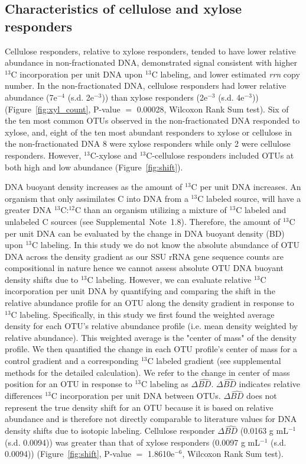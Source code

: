 \subsection{Characteristics of cellulose and xylose responders}
Cellulose responders, relative to xylose responders, tended to have lower
relative abundance in non-fractionated DNA, demonstrated signal consistent
with higher $^{13}$C incorporation per unit DNA upon $^{13}$C labeling, and
lower estimated \textit{rrn} copy number. In the
non-fractionated DNA, cellulose responders had lower
relative abundance (7e$^{-4}$ (s.d. 2e$^{-3}$)) than xylose responders
(2e$^{-3}$ (s.d. 4e$^{-3}$)) (Figure~\ref{fig:xyl_count}, P-value $=$ 0.00028,
Wilcoxon Rank Sum test). Six of the ten most common OTUs observed in the
non-fractionated DNA responded to xylose, and, eight of the ten most
abundant responders to xylose or cellulose in the non-fractionated DNA
8 were xylose responders while only 2 were cellulose responders. However,
$^{13}$C-xylose and $^{13}$C-cellulose responders included OTUs at both high
and low abundance (Figure~\ref{fig:shift}).

DNA buoyant density increases as the amount of $^{13}$C per unit DNA increases.
An organism that only assimilates C into DNA from a $^{13}$C labeled source,
will have a greater DNA $^{13}$C:$^{12}$C than an
organism utilizing a mixture of $^{13}$C labeled and unlabeled C sources (see
Supplemental~Note~1.8). Therefore, the amount of $^{13}$C per unit DNA
can be evaluated by the change in DNA buoyant density (BD)
upon $^{13}$C labeling. In this study we do not know the absolute abundance of
OTU DNA across the density gradient as our SSU rRNA gene sequence counts are
compositional in nature hence we cannot assess absolute OTU DNA buoyant density
shifts due to $^{13}$C labeling. However, we can evaluate relative $^{13}$C
incorporation per unit DNA by quantifying and comparing the
shift in the relative abundance profile for an OTU along the density gradient
in response to $^{13}$C labeling. Specifically, in this study we first found
the weighted average density for each OTU's relative abundance profile (i.e.
mean density weighted by relative abundance). This weighted average is the
"center of mass" of the density profile. We then quantified the change in each
OTU profile's center of mass for a control gradient and a corresponding
$^{13}$C labeled gradient (see supplemental methods for the detailed
calculation). We refer to the change in center of mass position for an OTU in
response to $^{13}$C labeling as $\Delta\hat{BD}$. $\Delta\hat{BD}$ indicates
relative differences $^{13}$C incorporation per unit DNA between OTUs.
$\Delta\hat{BD}$ does not represent the true density shift for an OTU because
it is based on relative abundance and is therefore not directly comparable to
literature values for DNA density shifts due to isotopic labeling. Cellulose
responder $\Delta\hat{BD}$ (0.0163 g mL$^{-1}$ (s.d.
0.0094)) was greater than that of xylose responders (0.0097
g mL$^{-1}$ (s.d. 0.0094)) (Figure~\ref{fig:shift}, P-value $=$ 1.8610e$^{-6}$,
Wilcoxon Rank Sum test). 

